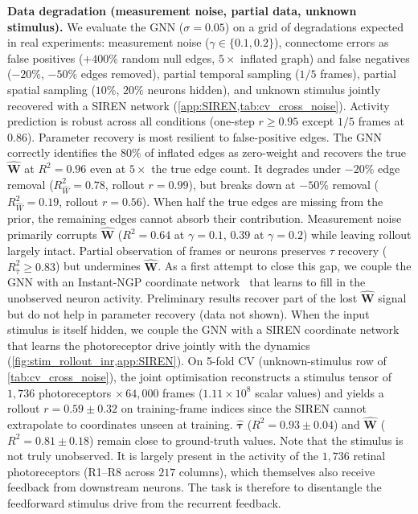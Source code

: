 \documentclass{article}
\begin{document}
\textbf{Data degradation (measurement noise, partial data, unknown stimulus).}\label{sec:degradation}
We evaluate the GNN ($\sigma=0.05$) on a grid of degradations expected in real experiments: measurement noise ($\gamma\in\{0.1,0.2\}$), connectome errors as false positives ($+400\%$ random null edges, $5\times$ inflated graph) and false negatives ($-20\%$, $-50\%$ edges removed), partial temporal sampling ($1/5$ frames), partial spatial sampling ($10\%$, $20\%$ neurons hidden), and unknown stimulus jointly recovered with a SIREN network (\cref{app:SIREN,tab:cv_cross_noise}). Activity prediction is robust across all conditions (one-step $r\geq0.95$ except $1/5$ frames at $0.86$). Parameter recovery is most resilient to false-positive edges. The GNN correctly identifies the $80\%$ of inflated edges as zero-weight and recovers the true $\hat{\mathbf{W}}$ at $R^2=0.96$ even at $5\times$ the true edge count. It degrades under $-20\%$ edge removal ($R^2_{\hat{W}}=0.78$, rollout $r=0.99$), but breaks down at $-50\%$ removal ($R^2_{\hat{W}}=0.19$, rollout $r=0.56$). When half the true edges are missing from the prior, the remaining edges cannot absorb their contribution. Measurement noise primarily corrupts $\hat{\mathbf{W}}$ ($R^2=0.64$ at $\gamma=0.1$, $0.39$ at $\gamma=0.2$) while leaving rollout largely intact. Partial observation of frames or neurons preserves $\tau$ recovery ($R^2_{\hat\tau}\geq0.83$) but undermines $\hat{\mathbf{W}}$. As a first attempt to close this gap, we couple the GNN with an Instant\nobreakdash-NGP coordinate network~\citep{muller_instant_2022} that learns to fill in the unobserved neuron activity. Preliminary results recover part of the lost $\hat{\mathbf{W}}$ signal but do not help in parameter recovery (data not shown). When the input stimulus is itself hidden, we couple the GNN with a SIREN coordinate network~\citep{sitzmann_implicit_2020} that learns the photoreceptor drive jointly with the dynamics (\cref{fig:stim_rollout_inr,app:SIREN}). On 5-fold CV (unknown-stimulus row of \cref{tab:cv_cross_noise}), the joint optimisation reconstructs a stimulus tensor of $1{,}736$ photoreceptors $\times\,64{,}000$ frames ($1.11\!\times\!10^{8}$ scalar values) and yields a rollout $r=0.59\pm 0.32$ on training-frame indices since the SIREN cannot extrapolate to coordinates unseen at training. $\hat{\boldsymbol{\tau}}$ ($R^2=0.93\pm 0.04$) and $\hat{\mathbf{W}}$ ($R^2=0.81\pm 0.18$) remain close to ground-truth values. Note that the stimulus is not truly unobserved. It is largely present in the activity of the $1{,}736$ retinal photoreceptors (R1--R8 across $217$ columns), which themselves also receive feedback from downstream neurons. The task is therefore to disentangle the feedforward stimulus drive from the recurrent feedback.
\end{document}

